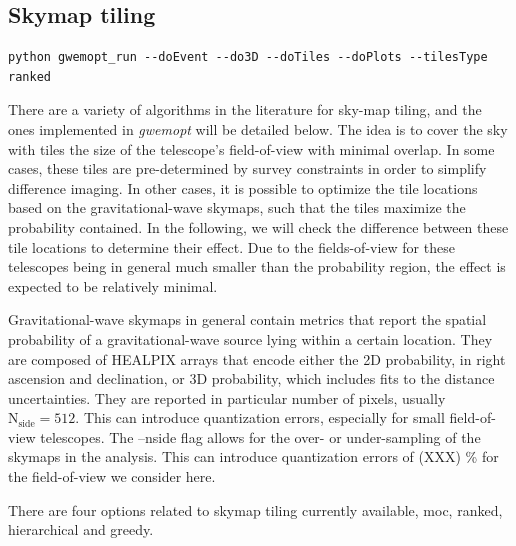 \documentclass[twocolumn]{aastex61}
\newcommand{\rednote}[1]{{\color{red} (#1)}}
\begin{document}
\subsection{Skymap tiling}
\begin{lstlisting}
python gwemopt_run --doEvent --do3D --doTiles --doPlots --tilesType ranked
\end{lstlisting}
There are a variety of algorithms in the literature for sky-map tiling, and the ones implemented in \emph{gwemopt} will be detailed below. The idea is to cover the sky with tiles the size of the telescope's field-of-view with minimal overlap. In some cases, these tiles are pre-determined by survey constraints in order to simplify difference imaging. In other cases, it is possible to optimize the tile locations based on the gravitational-wave skymaps, such that the tiles maximize the probability contained. In the following, we will check the difference between these tile locations to determine their effect. Due to the fields-of-view for these telescopes being in general much smaller than the probability region, the effect is expected to be relatively minimal.

Gravitational-wave skymaps in general contain metrics that report the spatial probability of a gravitational-wave source lying within a certain location.
They are composed of HEALPIX arrays that encode either the 2D probability, in right ascension and declination, or 3D probability, which includes fits to the distance uncertainties.
They are reported in particular number of pixels, usually $\textrm{N}_\textrm{side} = 512$. 
This can introduce quantization errors, especially for small field-of-view telescopes. 
The --nside flag allows for the over- or under-sampling of the skymaps in the analysis.
This can introduce quantization errors of \rednote{XXX} \% for the field-of-view we consider here.

There are four options related to skymap tiling currently available, moc, ranked, hierarchical and greedy.
\end{document}
